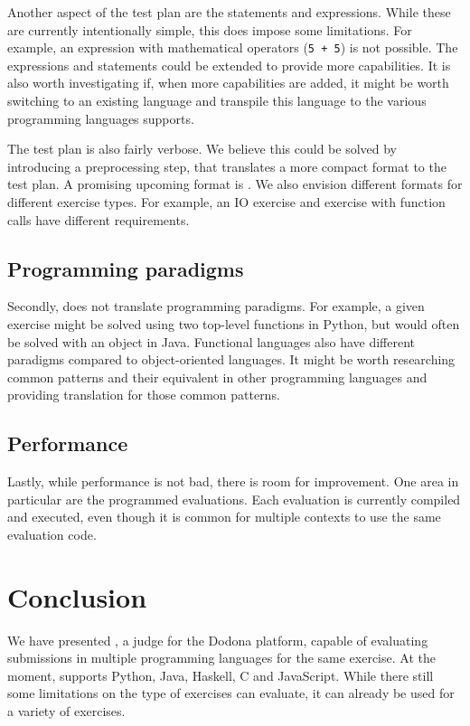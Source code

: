 \documentclass[5p,number]{elsarticle}
\begin{document}
    Another aspect of the test plan are the statements and expressions.
    While these are currently intentionally simple, this does impose some limitations.
    For example, an expression with mathematical operators (\texttt{5 + 5}) is not possible.
    The expressions and statements could be extended to provide more capabilities.
    It is also worth investigating if, when more capabilities are added, it might be worth switching to an existing language and transpile this language to the various programming languages \tested{} supports.
    
    The test plan is also fairly verbose.
    We believe this could be solved by introducing a preprocessing step, that translates a more compact format to the test plan.
    A promising upcoming format is \cite{peml}.
    We also envision different formats for different exercise types.
    For example, an IO exercise and exercise with function calls have different requirements.
    
    \subsection{Programming paradigms}\label{subsec:programming-paradigms}

    Secondly, \tested{} does not translate programming paradigms.
    For example, a given exercise might be solved using two top-level functions in Python, but would often be solved with an object in Java.
    Functional languages also have different paradigms compared to object-oriented languages.
    It might be worth researching common patterns and their equivalent in other programming languages and providing translation for those common patterns.
    
    \subsection{Performance}\label{subsec:performance}

    Lastly, while performance is not bad, there is room for improvement.
    One area in particular are the programmed evaluations.
    Each evaluation is currently compiled and executed, even though it is common for multiple contexts to use the same evaluation code.
    
    \section{Conclusion}\label{sec:conclusion}
    
    We have presented \tested{}, a judge for the Dodona platform, capable of evaluating submissions in multiple programming languages for the same exercise.
    At the moment, \tested{} supports Python, Java, Haskell, C and JavaScript.
    While there still some limitations on the type of exercises \tested{} can evaluate, it can already be used for a variety of exercises.

    
    
\end{document}
